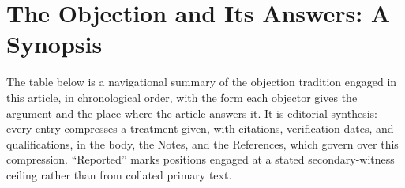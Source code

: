 \section{The Objection and Its Answers: A Synopsis}

The table below is a navigational summary of the objection tradition engaged in this article, in chronological order, with the form each objector gives the argument and the place where the article answers it. It is editorial synthesis: every entry compresses a treatment given, with citations, verification dates, and qualifications, in the body, the Notes, and the References, which govern over this compression. ``Reported'' marks positions engaged at a stated secondary-witness ceiling rather than from collated primary text.

\begingroup
\renewcommand{\arraystretch}{1.28}
\footnotesize
